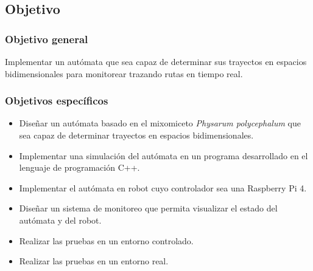 \subsection{Objetivo}
\label{sec-1-1-1}
    \subsubsection{Objetivo general}
    \label{sec-1-1-1-1}
        Implementar un aut\'omata que sea capaz de determinar sus trayectos en espacios bidimensionales para
            monitorear trazando rutas en tiempo real.
    \subsubsection{Objetivos espec\'ificos}
    \label{sec-1-1-1-2}
        \begin{itemize}
            \setlength\itemsep{-0.5em}
            \item Dise\~nar un aut\'omata basado en el mixomiceto \textit{Physarum polycephalum} que sea capaz de determinar
                trayectos en espacios bidimensionales.
            \item Implementar una simulaci\'on del aut\'omata en un programa desarrollado en el lenguaje de programaci\'on
                C++.
            \item Implementar el aut\'omata en robot cuyo controlador sea una Raspberry Pi 4.
            \item Dise\~nar un sistema de monitoreo que permita visualizar el estado del aut\'omata y del robot.
            \item Realizar las pruebas en un entorno controlado.
            \item Realizar las pruebas en un entorno real.
        \end{itemize}
